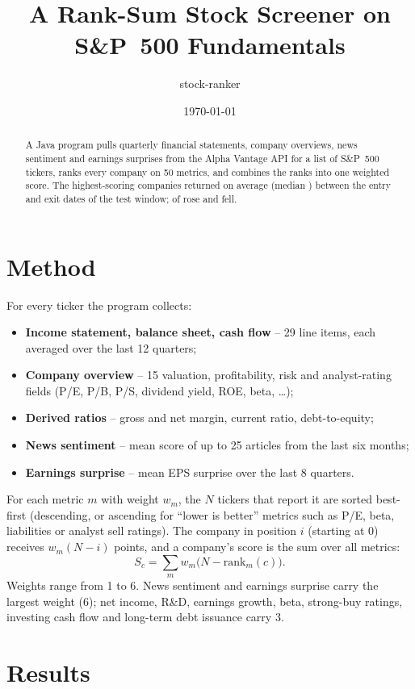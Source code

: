 \documentclass[11pt,a4paper]{article}
\title{A Rank-Sum Stock Screener on S\&P~500 Fundamentals}
\author{stock-ranker}
\date{\today}
\newcommand{\Window}{the entry and exit dates of the test window}
\begin{document}
\maketitle

\begin{abstract}
A Java program pulls quarterly financial statements, company overviews, news
sentiment and earnings surprises from the Alpha Vantage API for a list of
S\&P~500 tickers, ranks every company on 50 metrics, and combines the ranks
into one weighted score. The \NPicks{} highest-scoring companies returned
\MeanRet{} on average (median \MedianRet) between \Window{};
\Winners{} of \NPicks{} rose and \Losers{} fell.
\end{abstract}

\section{Method}

For every ticker the program collects:
\begin{itemize}\itemsep0pt
  \item \textbf{Income statement, balance sheet, cash flow} -- 29 line items,
        each averaged over the last 12 quarters;
  \item \textbf{Company overview} -- 15 valuation, profitability, risk and
        analyst-rating fields (P/E, P/B, P/S, dividend yield, ROE, beta, \dots);
  \item \textbf{Derived ratios} -- gross and net margin, current ratio, debt-to-equity;
  \item \textbf{News sentiment} -- mean score of up to 25 articles from the last six months;
  \item \textbf{Earnings surprise} -- mean EPS surprise over the last 8 quarters.
\end{itemize}

For each metric $m$ with weight $w_m$, the $N$ tickers that report it are
sorted best-first (descending, or ascending for ``lower is better'' metrics
such as P/E, beta, liabilities or analyst sell ratings). The company in
position $i$ (starting at $0$) receives $w_m (N - i)$ points, and a company's
score is the sum over all metrics:
\[
  S_c = \sum_{m} w_m \bigl(N - \mathrm{rank}_m(c)\bigr).
\]
Weights range from 1 to 6. News sentiment and earnings surprise carry the
largest weight (6); net income, R\&D, earnings growth, beta, strong-buy ratings,
investing cash flow and long-term debt issuance carry 3.

\section{Results}
\end{document}
